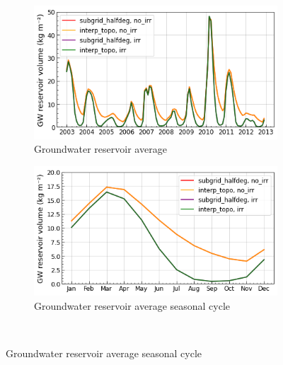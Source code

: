 \begin{figure}[htbp]
    \centering
    \begin{subfigure}[b]{0.48\textwidth}
        \caption{Groundwater reservoir average}
        \includegraphics[width=\textwidth]{images/chap3/time_series/cont_slowr_time_series.png}
    \end{subfigure}
        \begin{subfigure}[b]{0.48\textwidth}
        \caption{Groundwater reservoir average seasonal cycle}
        \includegraphics[width=\textwidth]{images/chap3/time_series/cont_slowr_seasonal_cycle.png}
    \end{subfigure} \\
    

\end{figure}
